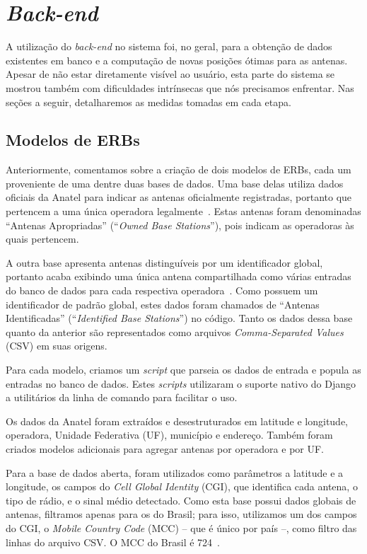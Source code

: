 \documentclass[]{politex}
\begin{document}
\section{\textit{Back-end}}

A utilização do \textit{back-end} no sistema foi, no geral, para a obtenção de
dados existentes em banco e a computação de novas posições ótimas para as antenas.
Apesar de não estar diretamente visível ao usuário, esta parte do sistema se
mostrou também com dificuldades intrínsecas que nós precisamos enfrentar. Nas
seções a seguir, detalharemos as medidas tomadas em cada etapa.

\subsection{Modelos de ERBs}

Anteriormente, comentamos sobre a criação de dois modelos de ERBs, cada um
proveniente de uma dentre duas bases de dados. Uma base delas utiliza
dados oficiais da Anatel para indicar as antenas oficialmente registradas,
portanto que pertencem a uma única operadora legalmente~\cite{mapa-erb}.
Estas antenas foram denominadas ``Antenas Apropriadas'' (``\textit{Owned Base
Stations}''), pois indicam as operadoras às quais pertencem.

A outra base apresenta antenas distinguíveis por um identificador global,
portanto acaba exibindo uma única antena compartilhada como várias entradas do
banco de dados para cada respectiva operadora~\cite{opencellid}. Como possuem um
identificador de padrão global, estes dados foram chamados de ``Antenas
Identificadas'' (``\textit{Identified Base Stations}'') no código. Tanto os
dados dessa base quanto da anterior são representados como arquivos
\textit{Comma-Separated Values} (CSV) em suas origens.

Para cada modelo, criamos um \textit{script} que parseia os dados de entrada e
popula as entradas no banco de dados. Estes \textit{scripts} utilizaram o
suporte nativo do Django a utilitários da linha de comando para facilitar o
uso.

Os dados da Anatel foram extraídos e desestruturados em latitude e longitude,
operadora, Unidade Federativa (UF), município e endereço. Também foram criados
modelos adicionais para agregar antenas por operadora e por UF.

Para a base de dados aberta, foram utilizados como parâmetros a latitude e a
longitude, os campos do \textit{Cell Global Identity} (CGI), que identifica cada
antena, o tipo de rádio, e o sinal médio detectado. Como esta base possui dados
globais de antenas, filtramos apenas para os do Brasil; para isso, utilizamos
um dos campos do CGI, o \textit{Mobile Country Code} (MCC) -- que é único por
país --, como filtro das linhas do arquivo CSV. O MCC do Brasil é 724~\cite{mcc-mnc}.
\end{document}
